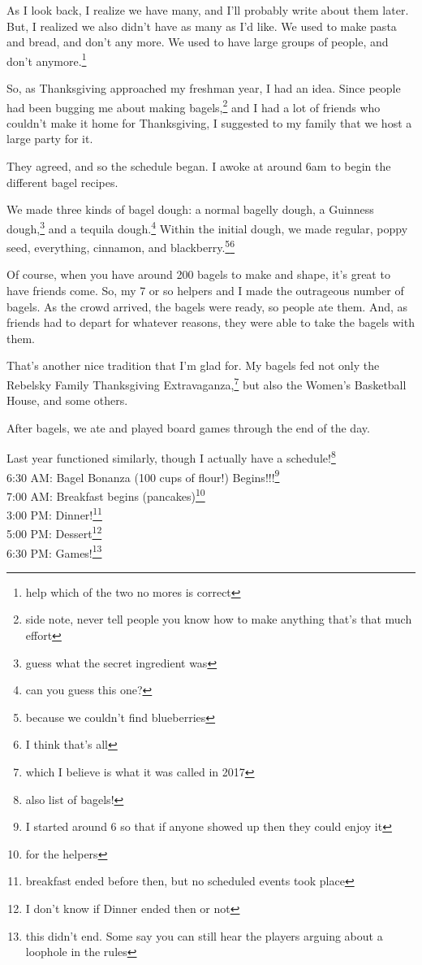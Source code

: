 \documentclass[12pt]{article}[titlepage]
\newcommand{\1}{\={a}}
\newcommand{\2}{\={e}}
\newcommand{\3}{\={\i}}
\newcommand{\4}{\=o}
\newcommand{\5}{\=u}
\newcommand{\6}{\={A}}
\renewcommand{\,}{\textsuperscript{,}}
\begin{document}
{As I look back, I realize we have many, and I'll probably write about them later.
But, I realized we also didn't have as many as I'd like.
We used to make pasta and bread, and don't any more.
We used to have large groups of people, and don't anymore.\footnote{help which of the two no mores is correct}

So, as Thanksgiving approached my freshman year, I had an idea.
Since people had been bugging me about making bagels,\footnote{side note, never tell people you know how to make anything that's that much effort} and I had a lot of friends who couldn't make it home for Thanksgiving, I suggested to my family that we host a large party for it.

They agreed, and so the schedule began.
I awoke at around 6am to begin the different bagel recipes.

We made three kinds of bagel dough: a normal bagelly dough, a Guinness dough,\footnote{guess what the secret ingredient was} and a tequila dough.\footnote{can you guess this one?}
Within the initial dough, we made regular, poppy seed, everything, cinnamon, and blackberry.\footnote{because we couldn't find blueberries}\footnote{I think that's all}

Of course, when you have around 200 bagels to make and shape, it's great to have friends come.
So, my 7 or so helpers and I made the outrageous number of bagels.
As the crowd arrived, the bagels were ready, so people ate them.
And, as friends had to depart for whatever reasons, they were able to take the bagels with them.

That's another nice tradition that I'm glad for.
My bagels fed not only the Rebelsky Family Thanksgiving Extravaganza,\footnote{which I believe is what it was called in 2017} but also the Women's Basketball House, and some others.

After bagels, we ate and played board games through the end of the day.

Last year functioned similarly, though I actually have a schedule!\footnote{also list of bagels!}\\
6:30 AM: Bagel Bonanza (100 cups of flour!) Begins!!!\footnote{I started around 6 so that if anyone showed up then they could enjoy it}\\
7:00 AM: Breakfast begins (pancakes)\footnote{for the helpers}\\
3:00 PM: Dinner!\footnote{breakfast ended before then, but no scheduled events took place}\\
5:00 PM: Dessert\footnote{I don't know if Dinner ended then or not}\\
6:30 PM: Games!\footnote{this didn't end. Some say you can still hear the players arguing about a loophole in the rules}

}
\end{document}
